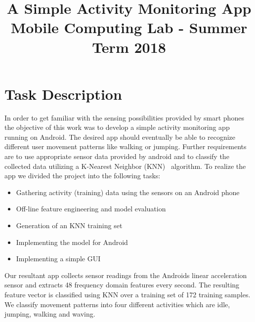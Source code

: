 \documentclass[conference]{IEEEtran}
\begin{document}
\title{A Simple Activity Monitoring App\\
{\large Mobile Computing Lab - Summer Term 2018}
}

\author{
\and
{}
}

\maketitle

\section{Task Description}
In order to get familiar with the sensing possibilities provided by smart phones the objective of this work was to develop a simple activity monitoring app running on Android. The desired app should eventually be able to recognize different user movement patterns like walking or jumping. Further requirements are to use appropriate sensor data provided by android and to classify the collected data utilizing a K-Nearest Neighbor (KNN)~\cite{knn1}\cite{knn2} algorithm. To realize the app we divided the project into the following tasks:
\begin{itemize}
\item Gathering activity (training) data using the sensors on an Android phone
\item Off-line feature engineering and model evaluation
\item Generation of an KNN training set
\item Implementing the model for Android
\item Implementing a simple GUI
\end{itemize}

Our resultant app collects sensor readings from the Androids linear acceleration sensor and extracts 48 frequency domain features every second. The resulting feature vector is classified using KNN over a training set of 172 training samples. We classify movement patterns into four different activities which are idle, jumping, walking and waving.
\end{document}
